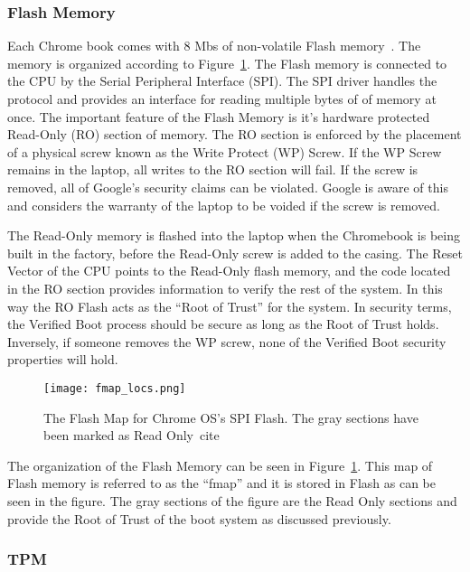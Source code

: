 \documentclass[../report.tex]{subfiles}
\begin{document}
\subsubsection{Flash Memory}

Each Chrome book comes with 8 Mbs of non-volatile Flash memory~\cite{fw-summit}.
The memory is organized according to Figure~\ref{fig:fmap}. 
The Flash memory is connected to the CPU by the Serial Peripheral Interface (SPI).
The SPI driver handles the protocol and provides an interface for reading multiple bytes of of memory at once.
The important feature of the Flash Memory is it's hardware protected Read-Only (RO) section of memory.
The RO section is enforced by the placement of a physical screw known as the Write Protect (WP) Screw.
If the WP Screw remains in the laptop, all writes to the RO section will fail.
If the screw is removed, all of Google's security claims can be violated. 
Google is aware of this and considers the warranty of the laptop to be voided if the screw is removed.

The Read-Only memory is flashed into the laptop when the Chromebook is being built in the factory, before the Read-Only screw is added to the casing. 
The Reset Vector of the CPU points to the Read-Only flash memory, and the code located in the RO section provides information to verify the rest of the system.
In this way the RO Flash acts as the ``Root of Trust'' for the system.
In security terms, the Verified Boot process should be secure as long as the Root of Trust holds.
Inversely, if someone removes the WP screw, none of the Verified Boot security properties will hold.

\begin{figure}
  \centering
  \texttt{[image: fmap\_locs.png]}
  \caption{The Flash Map for Chrome OS's SPI Flash. The gray sections have been marked as Read Only~cite\cite{fw-summit}}
  \label{fig:fmap}
\end{figure}

The organization of the Flash Memory can be seen in Figure~\ref{fig:fmap}.
This map of Flash memory is referred to as the ``fmap'' and it is stored in Flash as can be seen in the figure.
The gray sections of the figure are the Read Only sections and provide the Root of Trust of the boot system as discussed previously.

\subsubsection{TPM}
\end{document}
